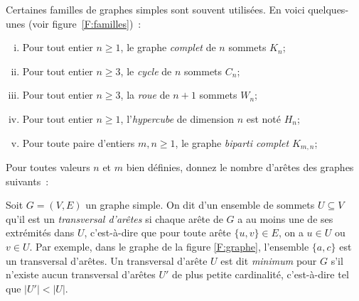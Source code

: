 \documentclass[12pt,addpoints]{exam}
\begin{document}
\begin{questions}
\question
Certaines familles de graphes simples sont souvent utilisées. En voici quelques-unes (voir figure~\ref{F:familles})~:
\begin{enumerate}[(i)]
  \item Pour tout entier $n \geq 1$, le graphe \emph{complet} de $n$ sommets $K_n$;
  \item Pour tout entier $n \geq 3$, le \emph{cycle} de $n$ sommets $C_n$;
  \item Pour tout entier $n \geq 3$, la \emph{roue} de $n + 1$ sommets $W_n$;
  \item Pour tout entier $n \geq 1$, l'\emph{hypercube} de dimension $n$ est noté $H_n$;
  \item Pour toute paire d'entiers $m,n \geq 1$, le graphe \emph{biparti complet} $K_{m,n}$;
\end{enumerate}
Pour toutes valeurs $n$ et $m$ bien définies, donnez le nombre d'arêtes des graphes suivants~:

\question
Soit $G = (V,E)$ un graphe simple. On dit d'un ensemble de sommets $U \subseteq V$ qu'il est un \emph{transversal d'arêtes} si chaque arête de $G$ a au moins une de ses extrémités dans $U$, c'est-à-dire que pour toute arête $\{u,v\} \in E$, on a $u \in U$ ou $v \in U$. Par exemple, dans le graphe de la figure \ref{F:graphe}, l'ensemble $\{a,c\}$ est un transversal d'arêtes. Un transversal d'arête $U$ est dit \emph{minimum} pour $G$ s'il n'existe aucun transversal d'arêtes $U'$ de plus petite cardinalité, c'est-à-dire tel que $|U'| < |U|$.


\end{questions}
\end{document}
